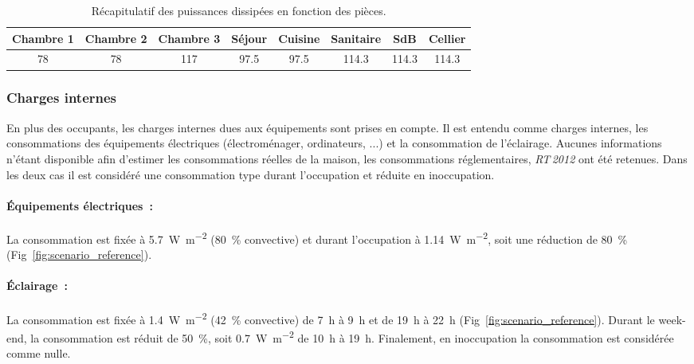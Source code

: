 \begin{table}
\centering
{}
\caption{Récapitulatif des puissances dissipées en fonction des pièces.}
\label{tab:puissance_occupants}
\begin{tabular}{*8{c}}
    \toprule
    Chambre 1 & Chambre 2  & Chambre 3 & Séjour     & Cuisine    & Sanitaire   & SdB         & Cellier     \\
    \midrule
    \num{78}  & \num{78}   & \num{117} & \num{97.5} & \num{97.5} & \num{114.3} & \num{114.3} & \num{114.3} \\
    \bottomrule
\end{tabular}
\end{table}


\subsubsection{Charges internes} %
\label{ssub:charges_internes}
En plus des occupants, les charges internes dues aux équipements sont prises en compte. Il
est entendu comme charges internes, les consommations des équipements électriques
(électroménager, ordinateurs, ...) et la consommation de l’éclairage. Aucunes informations
n’étant disponible afin d’estimer les consommations réelles de la maison, les
consommations réglementaires, \emph{RT\,2012} \parencite{CSTB2011} ont été retenues.
Dans les deux cas il est considéré une consommation type durant l’occupation
et réduite en inoccupation.

\paragraph{Équipements électriques~:} %
\label{par:equipements_electriques}
La consommation est fixée à \SI{5.7}{\watt\per m^{2}} (\SI{80}{\percent}
convective) et durant l’occupation à \SI{1.14}{\watt\per m^{2}}, soit une
réduction de \SI{80}{\percent} (Fig~\ref{fig:scenario_reference}).

\paragraph{Éclairage~:} %
\label{par:eclairage}
La consommation est fixée à \SI{1.4}{\watt\per m^{2}} (\SI{42}{\percent} convective) de
\SI{7}{\hour} à \SI{9}{\hour} et de \SI{19}{\hour} à \SI{22}{\hour}
(Fig~\ref{fig:scenario_reference}). Durant le week-end, la consommation est réduit de
\SI{50}{\percent}, soit \SI{0.7}{\watt\per m^{2}} de \SI{10}{\hour} à \SI{19}{\hour}.
Finalement, en inoccupation la consommation est considérée comme nulle.


